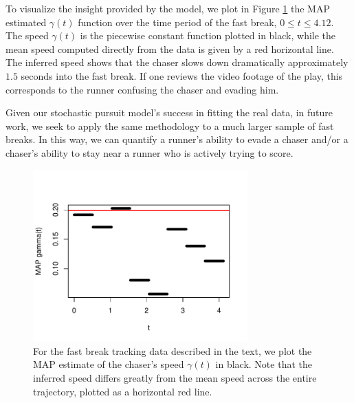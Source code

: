 \documentclass[graybox]{svmult}
\begin{document}
To visualize the insight provided by the model, we plot in Figure
\ref{fig:inferredgamma} the MAP
estimated $\gamma(t)$ function over the time period of the fast break,
$0 \leq t \leq 4.12$.  The speed $\gamma(t)$ is the piecewise constant
function plotted in black, while the mean speed computed directly from
the data is given by a red horizontal line.  The inferred speed shows
that the chaser slows down dramatically approximately $1.5$ seconds
into the fast break.  If one reviews the video footage of the play,
this corresponds to the runner confusing the chaser and evading him.

Given our stochastic pursuit model's success in fitting the real data,
in future work, we seek to apply the same methodology to a much larger
sample of fast breaks.  In this way, we can quantify a runner's
ability to evade a chaser and/or a chaser's ability to stay near a
runner who is actively trying to score.

\begin{figure}
\vspace{-0.5in}
\begin{center}
\includegraphics[width=3.25in]{inferredgamma}
\end{center}
\vspace{-0.25in}
\caption{For the fast break tracking data described in the text, we
  plot the MAP estimate of the chaser's speed $\gamma(t)$ in black.
  Note that the inferred speed differs greatly from the mean speed
  across the entire trajectory, plotted as a horizontal red line.}
\label{fig:inferredgamma}
\end{figure}


\vspace{-0.25in}



\end{document}
